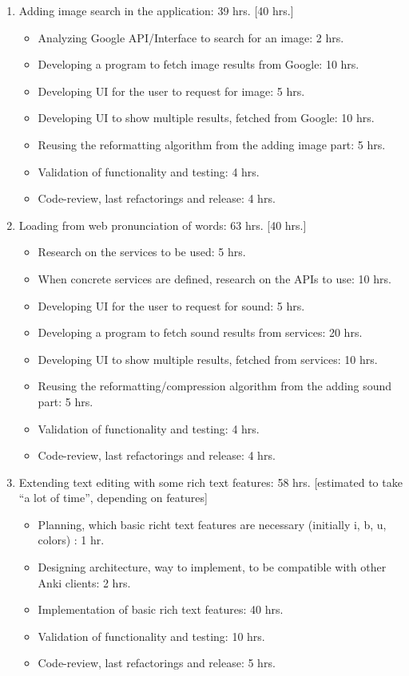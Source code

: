 \documentclass[a4paper,11pt,twoside]{article}
\begin{document}
\begin{enumerate}
\item Adding image search in the application: 39 hrs. [40 hrs.]
  \begin{itemize}
   \item Analyzing Google API/Interface to search for an image: 2 hrs.
   \item Developing a program to fetch image results from Google: 10 hrs.
   \item Developing UI for the user to request for image: 5 hrs.
   \item Developing UI to show multiple results, fetched from Google: 10 hrs.
   \item Reusing the reformatting algorithm from the adding image part: 5 hrs.
   \item Validation of functionality and testing: 4 hrs.
   \item Code-review, last refactorings and release: 4 hrs.
  \end{itemize}

\item Loading from web pronunciation of words: 63 hrs. [40 hrs.]
  \begin{itemize}
   \item Research on the services to be used: 5 hrs.
   \item When concrete services are defined, research on the APIs to use: 10 hrs.
   \item Developing UI for the user to request for sound: 5 hrs.
   \item Developing a program to fetch sound results from services: 20 hrs.
   \item Developing UI to show multiple results, fetched from services: 10 hrs.
   \item Reusing the reformatting/compression algorithm from the adding sound part: 5 hrs.
   \item Validation of functionality and testing: 4 hrs.
   \item Code-review, last refactorings and release: 4 hrs.
  \end{itemize}

\item Extending text editing with some rich text features: 58 hrs. [estimated to take ``a lot of time'', depending on features]
  \begin{itemize}
   \item Planning, which basic richt text features are necessary (initially i, b, u, colors) : 1 hr.
   \item Designing architecture, way to implement, to be compatible with other Anki clients: 2 hrs.
   \item Implementation of basic rich text features: 40 hrs.
   \item Validation of functionality and testing: 10 hrs.
   \item Code-review, last refactorings and release: 5 hrs.
  \end{itemize}


\end{enumerate}
\end{document}
